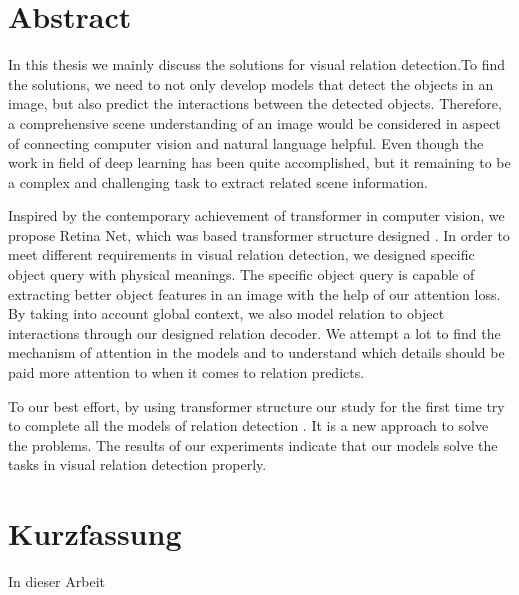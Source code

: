 \chapter*{Abstract}
\label{chap:Abstract}
\setcounter{page}{1}
In this thesis we mainly discuss  the solutions for visual relation detection.To find the solutions, we need to not only develop models that detect the objects in an image, but also predict the interactions between the detected objects. Therefore, a comprehensive scene understanding of an image would be considered in aspect of connecting computer vision and natural language  helpful. Even though the work in field of deep learning has been quite accomplished, but it remaining to be a complex and challenging task to extract related scene information. 

 Inspired by the contemporary achievement of transformer in computer vision, we propose Retina Net, which was based transformer structure designed . In order to meet different requirements in visual relation detection, we designed specific object query with physical meanings. The specific object query is capable of extracting better object features in an image with the help of our attention loss.  By taking into account global context, we also model relation to object interactions through our designed relation decoder. We attempt a lot to find the mechanism of attention in the models and to understand which details should be paid more attention to when it comes to relation predicts.
 
 To our best effort, by using transformer structure our study for the first time try to complete all the models of relation detection . It is a new approach to solve the problems. The results of our experiments indicate that our models solve the tasks in visual relation detection properly.


\chapter*{Kurzfassung}


\label{chap:Kurzfassung}

In dieser Arbeit 